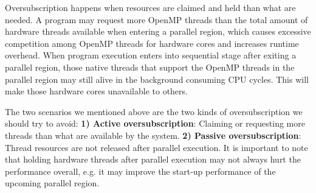 Oversubscription happens when resources are claimed and held than what are needed.
A program may request more OpenMP threads than the total amount of hardware
threads available when entering a {\sf parallel} region, which causes excessive competition 
among OpenMP threads for hardware cores and increases runtime overhead. 
When program execution enters into sequential stage after exiting a parallel region, 
those native threads that support the OpenMP threads in the parallel region may still 
alive in the background consuming CPU cycles. This 
will make those hardware cores unavailable to others. 


The two scenarios we mentioned above are the two kinds of oversubscription we should try to avoid:
{\bf 1) Active oversubscription}: Claiming or requesting more threads than 
what are available by the system.
{\bf 2) Passive oversubscription}: Thread resources are not released 
after parallel execution. It is important to note that holding hardware threads after parallel execution 
may not always hurt the performance overall, e.g. it may improve the start-up performance of the 
upcoming {\sf parallel} region. 


